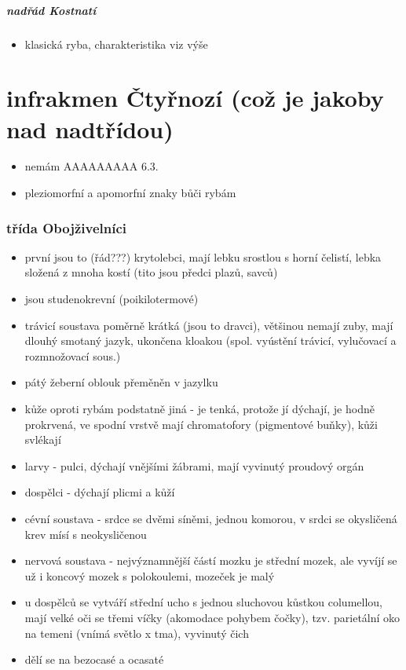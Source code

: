 \documentclass{article}
\begin{document}
\subsubsection{nadřád Kostnatí}
\begin{itemize}
  \item klasická ryba, charakteristika viz výše
\end{itemize}

\part{infrakmen Čtyřnozí (což je jakoby nad nadtřídou)}%
\begin{itemize}
  \item nemám AAAAAAAAA 6.3.
  \item pleziomorfní a apomorfní znaky bůči rybám
\end{itemize}

\section{třída Obojživelníci}
\begin{itemize}
  \item první jsou to (řád???) krytolebci, mají lebku srostlou s horní čelistí, lebka složená z mnoha kostí (tito jsou předci plazů, savců)
  \item jsou studenokrevní (poikilotermové)
  \item trávicí soustava poměrně krátká (jsou to dravci), většinou nemají zuby, mají dlouhý smotaný jazyk, ukončena kloakou (spol. vyústění trávicí, vylučovací a rozmnožovací sous.)
  \item pátý žeberní oblouk přeměněn v jazylku
  \item kůže oproti rybám podstatně jiná - je tenká, protože jí dýchají, je hodně prokrvená, ve spodní vrstvě mají chromatofory (pigmentové buňky), kůži svlékají
  \item larvy - pulci, dýchají vnějšími žábrami, mají vyvinutý proudový orgán
  \item dospělci - dýchají plicmi a kůží
  \item cévní soustava - srdce se dvěmi síněmi, jednou komorou, v srdci se okysličená krev mísí s neokysličenou
  \item nervová soustava - nejvýznamnější částí mozku je střední mozek, ale vyvíjí se už i koncový mozek s polokoulemi, mozeček je malý
  \item u dospělců se vytváří střední ucho s jednou sluchovou kůstkou columellou, mají velké oči se třemi víčky (akomodace pohybem čočky), tzv. parietální oko na temeni (vnímá světlo x tma), vyvinutý čich
  \item dělí se na bezocasé a ocasaté
\end{itemize}
\end{document}
